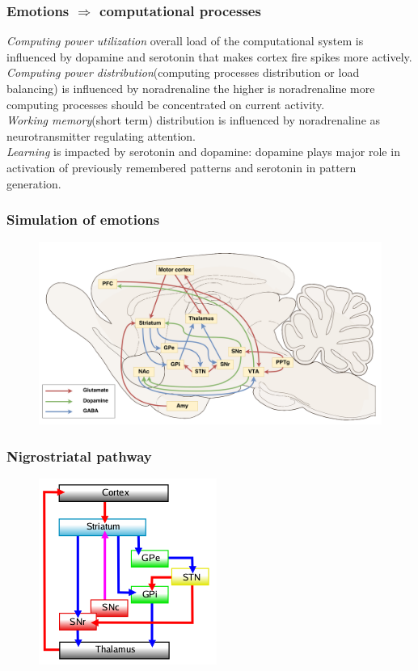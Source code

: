 \documentclass[12pt, aspectratio=169]{beamer}
\begin{document}
\begin{frame}
  \frametitle{Emotions $\Rightarrow$ computational processes}

\emph{Computing power utilization} overall load of the computational system is influenced by dopamine and serotonin that makes cortex fire spikes more actively.\\
\emph{Computing power distribution}(computing processes distribution or load balancing) is influenced by noradrenaline the higher is noradrenaline more computing processes should be concentrated on current activity.\\
\emph{Working memory}(short term) distribution is influenced by noradrenaline as neurotransmitter regulating attention.\\
\emph{Learning} is impacted by serotonin and dopamine: dopamine plays major role in activation of previously remembered patterns and serotonin in pattern generation.\\
\end{frame}


\begin{frame}
\frametitle{Simulation of emotions}
\begin{figure}
\includegraphics[width=0.99\linewidth]{rat_da}
\end{figure}
\end{frame}


\begin{frame}
\frametitle{Nigrostriatal pathway}
\begin{figure}
\includegraphics[width=0.45\linewidth]{nigrostriatal}
\end{figure}
\end{frame}
\end{document}
